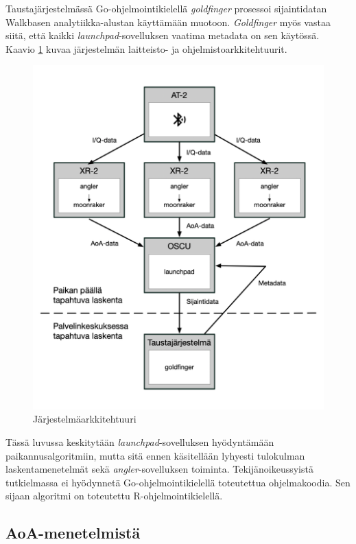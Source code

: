 \documentclass[
  12pt,
  a4paper, twoside]{book}
\begin{document}
Taustajärjestelmässä Go-ohjelmointikielellä \emph{goldfinger} prosessoi sijaintidatan Walkbasen analytiikka-alustan käyttämään muotoon. \emph{Goldfinger} myös vastaa siitä, että kaikki \emph{launchpad}-sovelluksen vaatima metadata on sen käytössä. Kaavio \ref{fig:jarjestelmaarkkitehtuuri} kuvaa järjestelmän laitteisto- ja ohjelmistoarkkitehtuurit.

\begin{figure}[H]
\centering
\includegraphics[width=15cm]{jarjestelmaarkkitehtuuri}
\caption{Järjestelmäarkkitehtuuri}
\label{fig:jarjestelmaarkkitehtuuri}
\end{figure}

Tässä luvussa keskitytään \emph{launchpad}-sovelluksen hyödyntämään paikannusalgoritmiin, mutta sitä ennen käsitellään lyhyesti tulokulman laskentamenetelmät sekä \emph{angler}-sovelluksen toiminta. Tekijänoikeussyistä tutkielmassa ei hyödynnetä Go-ohjelmointikielellä toteutettua ohjelmakoodia. Sen sijaan algoritmi on toteutettu R-ohjelmointikielellä.

\subsection{AoA-menetelmistä} \label{aoa}
\end{document}
